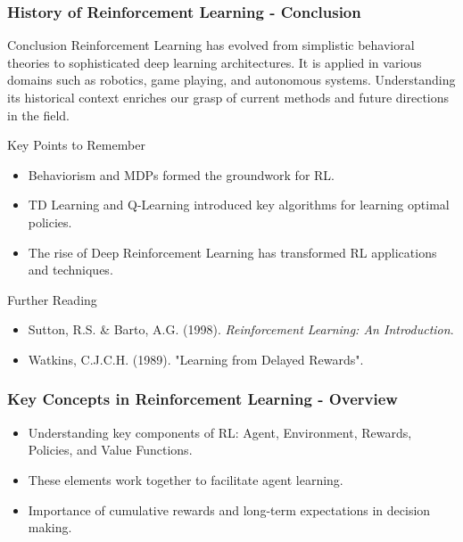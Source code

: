 \documentclass{beamer}
\begin{document}
\begin{frame}[fragile]
    \frametitle{History of Reinforcement Learning - Conclusion}
    \begin{block}{Conclusion}
        Reinforcement Learning has evolved from simplistic behavioral theories to sophisticated deep learning architectures. It is applied in various domains such as robotics, game playing, and autonomous systems. Understanding its historical context enriches our grasp of current methods and future directions in the field.
    \end{block}
    
    \begin{block}{Key Points to Remember}
        \begin{itemize}
            \item Behaviorism and MDPs formed the groundwork for RL.
            \item TD Learning and Q-Learning introduced key algorithms for learning optimal policies.
            \item The rise of Deep Reinforcement Learning has transformed RL applications and techniques.
        \end{itemize}
    \end{block}
    
    \begin{block}{Further Reading}
        \begin{itemize}
            \item Sutton, R.S. \& Barto, A.G. (1998). \textit{Reinforcement Learning: An Introduction}.
            \item Watkins, C.J.C.H. (1989). "Learning from Delayed Rewards".
        \end{itemize}
    \end{block}
\end{frame}

\begin{frame}[fragile]
    \frametitle{Key Concepts in Reinforcement Learning - Overview}
    \begin{itemize}
        \item Understanding key components of RL: Agent, Environment, Rewards, Policies, and Value Functions.
        \item These elements work together to facilitate agent learning.
        \item Importance of cumulative rewards and long-term expectations in decision making.
    \end{itemize}
\end{frame}
\end{document}
